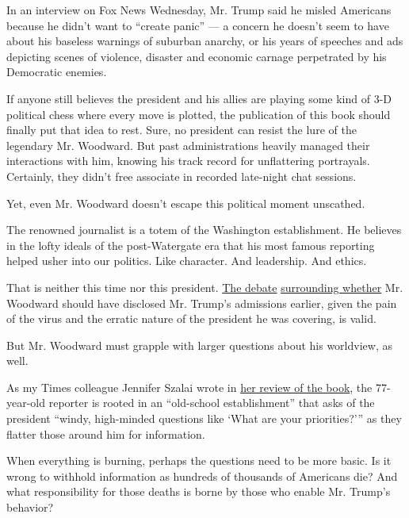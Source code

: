 In an interview on Fox News Wednesday, Mr. Trump said he misled
Americans because he didn't want to ``create panic'' --- a concern he
doesn't seem to have about his baseless warnings of suburban anarchy, or
his years of speeches and ads depicting scenes of violence, disaster and
economic carnage perpetrated by his Democratic enemies.

If anyone still believes the president and his allies are playing some
kind of 3-D political chess where every move is plotted, the publication
of this book should finally put that idea to rest. Sure, no president
can resist the lure of the legendary Mr. Woodward. But past
administrations heavily managed their interactions with him, knowing his
track record for unflattering portrayals. Certainly, they didn't free
associate in recorded late-night chat sessions.

Yet, even Mr. Woodward doesn't escape this political moment unscathed.

The renowned journalist is a totem of the Washington establishment. He
believes in the lofty ideals of the post-Watergate era that his most
famous reporting helped usher into our politics. Like character. And
leadership. And ethics.

That is neither this time nor this president.
\href{https://www.washingtonpost.com/lifestyle/media/should-bob-woodward-have-reported-trumps-virus-revelations-sooner-heres-how-he-defends-his-decision/2020/09/09/6bd7fc32-f2d1-11ea-b796-2dd09962649c_story.html?hpid=hp_hp-top-table-high_sullivan-620pm\%3Ahomepage\%2Fstory-ans\&_ga=2.233865310.1105897825.1599753802-2110227108.1596023352}{The
debate}
\href{https://apnews.com/99916044401d8f8e24eb7bedfec1d5d2}{surrounding
whether} Mr. Woodward should have disclosed Mr. Trump's admissions
earlier, given the pain of the virus and the erratic nature of the
president he was covering, is valid.

But Mr. Woodward must grapple with larger questions about his worldview,
as well.

As my Times colleague Jennifer Szalai wrote in
\href{https://www.nytimes3xbfgragh.onion/2020/09/09/books/review-rage-donald-trump-bob-woodward.html}{her
review of the book}, the 77-year-old reporter is rooted in an
``old-school establishment'' that asks of the president ``windy,
high-minded questions like `What are your priorities?''' as they flatter
those around him for information.

When everything is burning, perhaps the questions need to be more basic.
Is it wrong to withhold information as hundreds of thousands of
Americans die? And what responsibility for those deaths is borne by
those who enable Mr. Trump's behavior?

